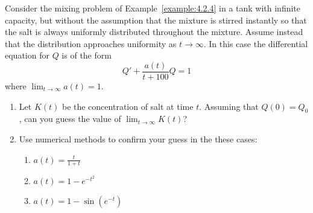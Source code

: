 \documentclass{ximera}
\begin{document}
\begin{problem}\label{exer:4.2.23}  
Consider the mixing problem of Example~\ref{example:4.2.4} in a tank with
infinite capacity, but without the assumption that the mixture is
stirred instantly so that the salt is always uniformly distributed
throughout the mixture. Assume instead that the distribution
approaches uniformity as $t\to\infty$. In this case the differential
equation for $Q$ is of the form
$$
Q'+\frac{a(t)}{t+100}Q=1
$$
where  $\lim_{t\to\infty}a(t)=1$.
\begin{enumerate}
\item %
Let $K(t)$ be the concentration of salt at time $t$. Assuming that
$Q(0)=Q_0$, can you guess the value of $\lim_{t\to\infty}K(t)$?
\item %
Use numerical methods to  confirm  your guess in the these cases:
\begin{enumerate}
    \item $a(t)=\frac{t}{1+t}$
    \item $a(t)=1-e^{-t^2}$
    \item $a(t)=1-\sin(e^{-t})$
\end{enumerate}


\end{enumerate}
\end{problem}
\end{document}
